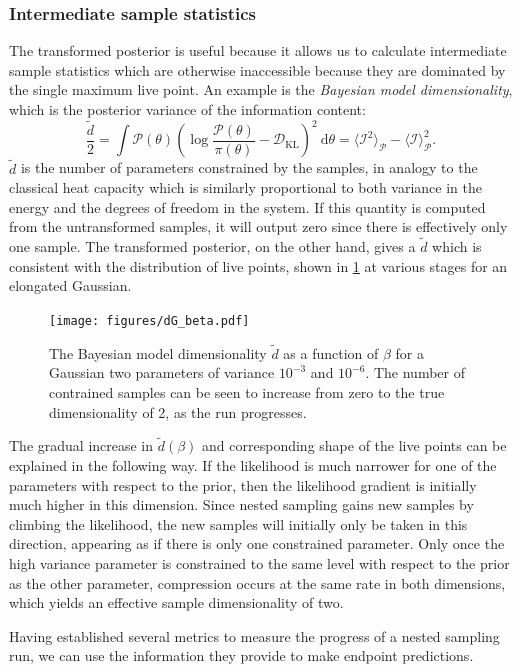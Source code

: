 \documentclass[usenatbib]{mnras}
\newcommand{\DKL}{\mathcal{D}_\mathrm{KL}}
\begin{document}
\subsubsection*{Intermediate sample statistics}
The transformed posterior is useful because it allows us to calculate intermediate sample statistics which are otherwise inaccessible because they are dominated by the single maximum live point. An example is the \textit{Bayesian model dimensionality}, which is the posterior variance of the information content:
\begin{equation}
\frac{\tilde{d}}{2} = \int \mathcal{P}(\theta) \left(\log \frac{\mathcal{P}(\theta)}{\pi(\theta)} - \DKL\right)^2 \: \mathrm{d}\theta
= \langle \mathcal{I}^2 \rangle_\mathcal{P} - \langle \mathcal{I} \rangle^2_\mathcal{P}.
\end{equation}
$\tilde{d}$ is the number of parameters constrained by the samples, in analogy to the classical heat capacity which is similarly proportional to both variance in the energy and the degrees of freedom in the system. If this quantity is computed from the untransformed samples, it will output zero since there is effectively only one sample. The transformed posterior, on the other hand, gives a $\tilde{d}$ which is consistent with the distribution of live points, shown in \cref{fig:dG_beta} at various stages for an elongated Gaussian. 
\begin{figure}
\begin{center}
	\texttt{[image: figures/dG\_beta.pdf]}
\end{center}
\caption{The Bayesian model dimensionality $\tilde{d}$ as a function of $\beta$ for a Gaussian two parameters of variance $10^{-3}$ and $10^{-6}$. The number of contrained samples can be seen to increase from zero to the true dimensionality of 2, as the run progresses.}
\label{fig:dG_beta}
\end{figure}
\par
The gradual increase in $\tilde{d}(\beta)$ and corresponding shape of the live points can be explained in the following way. If the likelihood is much narrower for one of the parameters with respect to the prior, then the likelihood gradient is initially much higher in this dimension. Since nested sampling gains new samples by climbing the likelihood, the new samples will initially only be taken in this direction, appearing as if there is only one constrained parameter. Only once the high variance parameter is constrained to the same level with respect to the prior as the other parameter, compression occurs at the same rate in both dimensions, which yields an effective sample dimensionality of two.
\par
Having established several metrics to measure the progress of a nested sampling run, we can use the information they provide to make endpoint predictions.
\end{document}
